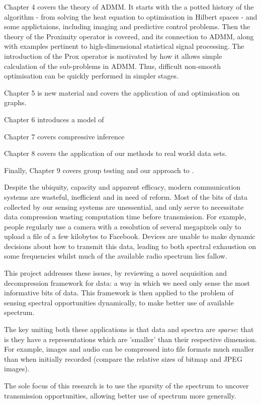 Chapter 4 covers the theory of ADMM. It starts with the a potted history of the algorithm - from solving the heat equation to optimisation in Hilbert spaces - and some applictaions, including imaging and predictive control problems. Then the theory of the Proximity operator is covered, and its connection to ADMM, along with examples pertinent to high-dimensional statistical signal processing. The introduction of the Prox operator is motivated by how it allows simple calculation of the sub-problems in ADMM. Thus, difficult non-smooth optimisation can be quickly performed in simpler stages.

Chapter 5 is new material and covers the application of and optimisation on graphs.

Chapter 6 introduces a model of 

Chapter 7 covers compressive inference

Chapter 8 covers the application of our methods to real world data sets.

Finally, Chapter 9 covers group testing and our approach to .

Despite the ubiquity, capacity and apparent efficacy, modern communication systems are wasteful, inefficient and in need of reform. Most of the bits of data collected by our sensing systems are unessential, and only serve to necessitate data compression wasting computation time before transmission. For example, people regularly use a camera with a resolution of several megapixels only to upload a file of a few kilobytes to Facebook. Devices are unable to make dynamic decisions about how to transmit this data, leading to both spectral exhaustion on some frequencies whilst much of the available radio spectrum lies fallow. 

This project addresses these issues, by reviewing a novel acquisition and decompression framework for data: a way in which we need only sense the most informative bits of data. This framework is then applied to the problem of sensing spectral opportunities dynamically, to make better use of available spectrum. 

The key uniting both these applications is that data and spectra are \textit{sparse}: that is they have a representations which are 'smaller' than their respective dimension. For example, images and audio can be compressed into file formats much smaller than when initially recorded (compare the relative sizes of bitmap and JPEG images).

The sole focus of this research is to use the sparsity of the spectrum to uncover transmission opportunities, allowing better use of spectrum more generally. 

